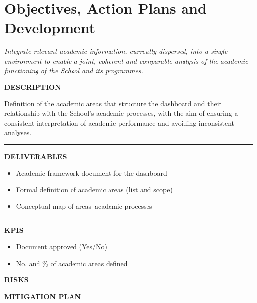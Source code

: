 \documentclass[11pt,a4paper]{scrreprt}
\newcommand{\fieldlabel}[1]{%
  {\footnotesize\sffamily\bfseries\color{mutedcolor}\MakeUppercase{#1}}\par\nopagebreak[4]
}
\newcommand{\fieldsep}{\vspace{3pt}\noindent\textcolor{bordercolor}{\rule{\linewidth}{0.4pt}}\vspace{3pt}\par}
\begin{document}
\newpage
{}
\section{Objectives, Action Plans and Development}
{\small\color{mutedcolor}\itshape Integrate relevant academic information, currently dispersed, into a single environment to enable a joint, coherent and comparable analysis of the academic functioning of the School and its programmes.}\par\vspace{6pt}

\begin{tcolorbox}[pabox={dashcolor}{A.P.1.1 \enspace\textbullet\enspace Definition of the Academic Framework and Dashboard Areas}]

\fieldlabel{Description}
{\small Definition of the academic areas that structure the dashboard and their relationship with the School's academic processes, with the aim of ensuring a consistent interpretation of academic performance and avoiding inconsistent analyses.}\par
\fieldsep
\fieldlabel{Deliverables}
{\small \begin{itemize}[noitemsep,topsep=2pt]
\item Academic framework document for the dashboard
\item Formal definition of academic areas (list and scope)
\item Conceptual map of areas--academic processes
\end{itemize}}\par
\fieldsep
\fieldlabel{KPIs}
{\small \begin{itemize}[noitemsep,topsep=2pt]
\item Document approved (Yes/No)
\item No. and \% of academic areas defined
\end{itemize}}\par
\end{tcolorbox}
\begin{tcolorbox}[riskbox]
{\footnotesize\sffamily\bfseries\color{red!50!black} RISKS}\par{}
\end{tcolorbox}
\begin{tcolorbox}[mitbox]
{\footnotesize\sffamily\bfseries\color{green!40!black} MITIGATION PLAN}\par{}
\end{tcolorbox}
\vspace{8pt}
\end{document}
